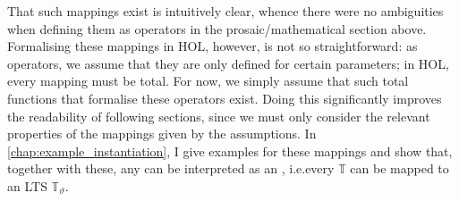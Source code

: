 \begin{isabellebody}
\begin{isamarkuptext}
That such mappings exist is intuitively clear, whence there were no ambiguities when defining them as operators in the prosaic/mathematical section above. Formalising these mappings in HOL, however, is not so straight\-forward: as operators, we assume that they are only defined for certain parameters; in HOL, every mapping must be total. For now, we simply assume that such total functions that formalise these operators exist. Doing this significantly improves the readability of following sections, since we must only consider the relevant properties of the mappings given by the assumptions. In \cref{chap:example_instantiation}, I give examples for these mappings and show that, together with these, any  can be interpreted as an , i.e.\@ every \LTSt{} $\mathbb{T}$ can be mapped to an LTS $\mathbb{T}_\vartheta$.


\end{isamarkuptext}
\end{isabellebody}
